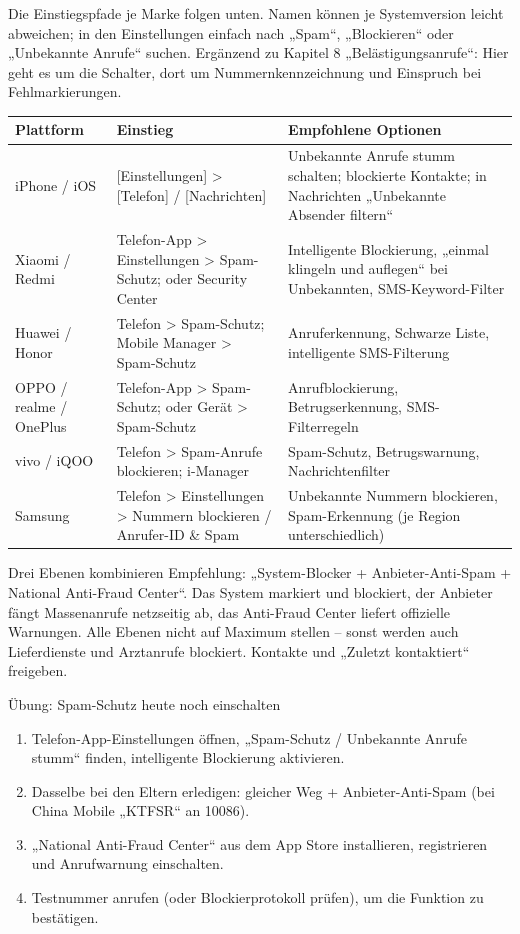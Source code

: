 
Die Einstiegspfade je Marke folgen unten. Namen können je Systemversion leicht abweichen; in den Einstellungen einfach nach „Spam“, „Blockieren“ oder „Unbekannte Anrufe“ suchen. Ergänzend zu Kapitel 8 „Belästigungsanrufe“: Hier geht es um die Schalter, dort um Nummernkennzeichnung und Einspruch bei Fehlmarkierungen.

\begin{center}
\begin{tabularx}{\linewidth}{|X|X|X|}
\hline
\textbf{Plattform} & \textbf{Einstieg} & \textbf{Empfohlene Optionen} \tabularnewline
\hline
iPhone / iOS & {}[Einstellungen] > [Telefon] / [Nachrichten] & Unbekannte Anrufe stumm schalten; blockierte Kontakte; in Nachrichten „Unbekannte Absender filtern“ \tabularnewline
Xiaomi / Redmi & Telefon-App > Einstellungen > Spam-Schutz; oder Security Center & Intelligente Blockierung, „einmal klingeln und auflegen“ bei Unbekannten, SMS-Keyword-Filter \tabularnewline
Huawei / Honor & Telefon > Spam-Schutz; Mobile Manager > Spam-Schutz & Anruferkennung, Schwarze Liste, intelligente SMS-Filterung \tabularnewline
OPPO / realme / OnePlus & Telefon-App > Spam-Schutz; oder Gerät > Spam-Schutz & Anrufblockierung, Betrugserkennung, SMS-Filterregeln \tabularnewline
vivo / iQOO & Telefon > Spam-Anrufe blockieren; i-Manager & Spam-Schutz, Betrugswarnung, Nachrichtenfilter \tabularnewline
Samsung & Telefon > Einstellungen > Nummern blockieren / Anrufer-ID \& Spam & Unbekannte Nummern blockieren, Spam-Erkennung (je Region unterschiedlich) \tabularnewline
\hline
\end{tabularx}
\end{center}

\begin{tcbinfo}{Drei Ebenen kombinieren}
Empfehlung: „System-Blocker + Anbieter-Anti-Spam + National Anti-Fraud Center“. Das System markiert und blockiert, der Anbieter fängt Massenanrufe netzseitig ab, das Anti-Fraud Center liefert offizielle Warnungen. Alle Ebenen nicht auf Maximum stellen – sonst werden auch Lieferdienste und Arztanrufe blockiert. Kontakte und „Zuletzt kontaktiert“ freigeben.

\end{tcbinfo}

\begin{tcbpractice}{Übung: Spam-Schutz heute noch einschalten}
\begin{enumerate}
  \item Telefon-App-Einstellungen öffnen, „Spam-Schutz / Unbekannte Anrufe stumm“ finden, intelligente Blockierung aktivieren.
  \item Dasselbe bei den Eltern erledigen: gleicher Weg + Anbieter-Anti-Spam (bei China Mobile „KTFSR“ an 10086).
  \item „National Anti-Fraud Center“ aus dem App Store installieren, registrieren und Anrufwarnung einschalten.
  \item Testnummer anrufen (oder Blockierprotokoll prüfen), um die Funktion zu bestätigen.
\end{enumerate}

\end{tcbpractice}


